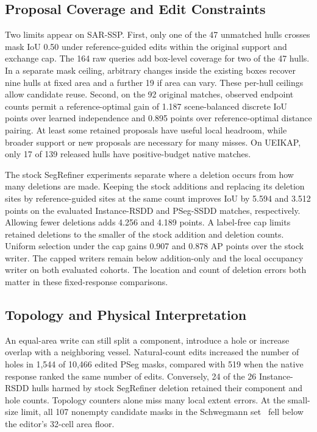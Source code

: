 \documentclass[journal]{IEEEtran}
\begin{document}
\subsection{Proposal Coverage and Edit Constraints}
Two limits appear on SAR-SSP. First, only one of the 47 unmatched hulls crosses mask IoU 0.50 under reference-guided edits within the original support and exchange cap. The 164 raw queries add box-level coverage for two of the 47 hulls. In a separate mask ceiling, arbitrary changes inside the existing boxes recover nine hulls at fixed area and a further 19 if area can vary. These per-hull ceilings allow candidate reuse. Second, on the 92 original matches, observed endpoint counts permit a reference-optimal gain of 1.187 scene-balanced discrete IoU points over learned independence and 0.895 points over reference-optimal distance pairing. At least some retained proposals have useful local headroom, while broader support or new proposals are necessary for many misses. On UEIKAP, only 17 of 139 released hulls have positive-budget native matches.

The stock SegRefiner experiments separate where a deletion occurs from how many deletions are made. Keeping the stock additions and replacing its deletion sites by reference-guided sites at the same count improves IoU by 5.594 and 3.512 points on the evaluated Instance-RSDD and PSeg-SSDD matches, respectively. Allowing fewer deletions adds 4.256 and 4.189 points. A label-free cap limits retained deletions to the smaller of the stock addition and deletion counts. Uniform selection under the cap gains 0.907 and 0.878 AP points over the stock writer. The capped writers remain below addition-only and the local occupancy writer on both evaluated cohorts. The location and count of deletion errors both matter in these fixed-response comparisons.

\subsection{Topology and Physical Interpretation}
An equal-area write can still split a component, introduce a hole or increase overlap with a neighboring vessel. Natural-count edits increased the number of holes in 1,544 of 10,466 edited PSeg masks, compared with 519 when the native response ranked the same number of edits. Conversely, 24 of the 26 Instance-RSDD hulls harmed by stock SegRefiner deletion retained their component and hole counts. Topology counters alone miss many local extent errors. At the small-size limit, all 107 nonempty candidate masks in the Schwegmann set~\cite{schwegmann} fell below the editor's 32-cell area floor.
\end{document}
